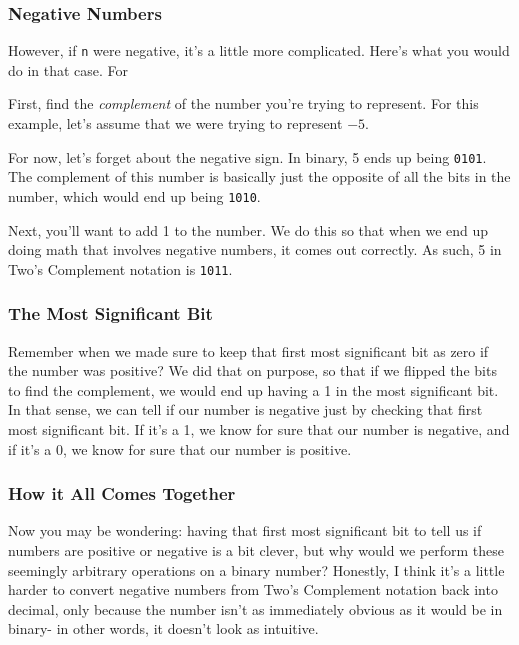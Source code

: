 \documentclass[english, 10pt]{article}
\begin{document}
\subsubsection{Negative Numbers}

However, if \texttt{n} were negative, it's a little more complicated. Here's what you would do in that case. For\newline

First, find the \textit{complement} of the number you're trying to represent. For this example, let's assume that we were trying to represent $-5$.\newline

For now, let's forget about the negative sign. In binary, 5 ends up being \texttt{0101}. The complement of this number is basically just the opposite of all the bits in the number, which would end up being \texttt{1010}.\newline

Next, you'll want to add 1 to the number. We do this so that when we end up doing math that involves negative numbers, it comes out correctly. As such, 5 in Two's Complement notation is \texttt{1011}.\newline

\subsubsection{The Most Significant Bit}

Remember when we made sure to keep that first most significant bit as zero if the number was positive? We did that on purpose, so that if we flipped the bits to find the complement, we would end up having a 1 in the most significant bit. In that sense, we can tell if our number is negative just by checking that first most significant bit. If it's a 1, we know for sure that our number is negative, and if it's a 0, we know for sure that our number is positive.

\subsubsection{How it All Comes Together}

Now you may be wondering: having that first most significant bit to tell us if numbers are positive or negative is a bit clever, but why would we perform these seemingly arbitrary operations on a binary number? Honestly, I think it's a little harder to convert negative numbers from Two's Complement notation back into decimal, only because the number isn't as immediately obvious as it would be in binary- in other words, it doesn't look as intuitive.\newline
\end{document}

